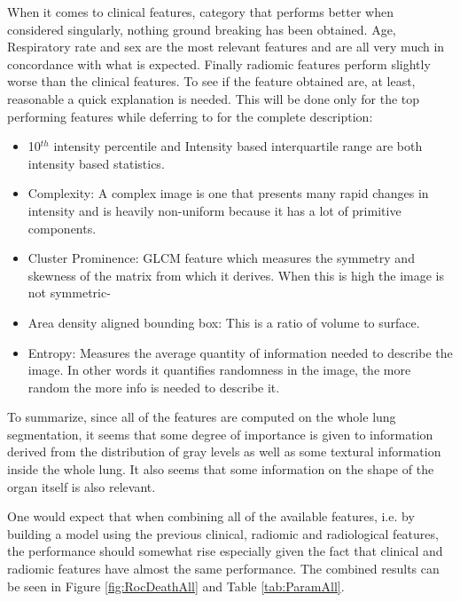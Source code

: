 When it comes to clinical features, category that performs better when considered singularly, nothing ground breaking has been obtained.
Age, Respiratory rate and sex are the most relevant features and are all very much in concordance with what is expected. Finally radiomic features perform slightly worse than the clinical features. To see if the feature obtained are, at least, reasonable a quick explanation is needed. 
This will be done only for the top performing features while deferring to \cite{IBSI} for the complete description:

\begin{itemize}
\item 10$^{th}$ intensity percentile and Intensity based interquartile range are both intensity based statistics.
\item Complexity: A complex image is one that presents many rapid changes in intensity and is heavily non-uniform because it has a lot of primitive components.
\item Cluster Prominence: GLCM feature which measures the symmetry and skewness of the matrix from which it derives. When this is high the image is not symmetric-
\item Area density aligned bounding box: This is a ratio of volume to surface.
\item Entropy: Measures the average quantity of information needed to describe the image. In other words it quantifies randomness in the image, the more random the more info is needed to describe it.
\end{itemize}

To summarize, since all of the features are computed on the whole lung segmentation, it seems that some degree of importance is given to information derived from the distribution of gray levels as well as some textural information inside the whole lung.
It also seems that some information on the shape of the organ itself is also relevant.

One would expect that when combining all of the available features, i.e. by building a model using the previous clinical, radiomic and radiological features, the performance should somewhat rise especially given the fact that clinical and radiomic features have almost the same performance. The combined results can be seen in Figure \ref{fig:RocDeathAll} and Table \ref{tab:ParamAll}.

